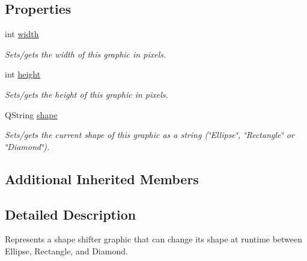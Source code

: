 \subsection*{Properties}
\begin{DoxyCompactItemize}
\item 
\hypertarget{class_picto_1_1_shape_shifter_graphic_a0b7a77f83e77957fe2fea1575eabab5e}{int \hyperlink{class_picto_1_1_shape_shifter_graphic_a0b7a77f83e77957fe2fea1575eabab5e}{width}}\label{class_picto_1_1_shape_shifter_graphic_a0b7a77f83e77957fe2fea1575eabab5e}

\begin{DoxyCompactList}\small\item\em Sets/gets the width of this graphic in pixels. \end{DoxyCompactList}\item 
\hypertarget{class_picto_1_1_shape_shifter_graphic_a116e77570cc75d352ed51d76a41a4529}{int \hyperlink{class_picto_1_1_shape_shifter_graphic_a116e77570cc75d352ed51d76a41a4529}{height}}\label{class_picto_1_1_shape_shifter_graphic_a116e77570cc75d352ed51d76a41a4529}

\begin{DoxyCompactList}\small\item\em Sets/gets the height of this graphic in pixels. \end{DoxyCompactList}\item 
\hypertarget{class_picto_1_1_shape_shifter_graphic_ace966c77442da340b866a2992552c59e}{Q\-String \hyperlink{class_picto_1_1_shape_shifter_graphic_ace966c77442da340b866a2992552c59e}{shape}}\label{class_picto_1_1_shape_shifter_graphic_ace966c77442da340b866a2992552c59e}

\begin{DoxyCompactList}\small\item\em Sets/gets the current shape of this graphic as a string (\char`\"{}\-Ellipse\char`\"{}, \char`\"{}\-Rectangle\char`\"{} or \char`\"{}\-Diamond\char`\"{}). \end{DoxyCompactList}\end{DoxyCompactItemize}
\subsection*{Additional Inherited Members}


\subsection{Detailed Description}
Represents a shape shifter graphic that can change its shape at runtime between Ellipse, Rectangle, and Diamond. 

